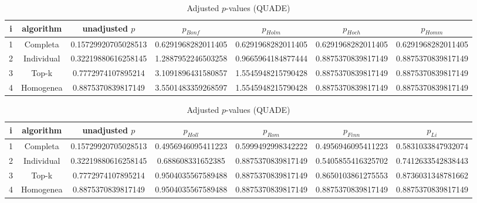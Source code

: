 \documentclass[a4paper,10pt]{article}
\begin{document}
\begin{landscape}
\newpage

\begin{table}[!htp]
\centering\scriptsize
\caption{Adjusted $p$-values (QUADE)}
\begin{tabular}{ccccccc}
i&algorithm&unadjusted $p$&$p_{Bonf}$&$p_{Holm}$&$p_{Hoch}$&$p_{Homm}$\\
\hline
1&Completa&0.15729920705028513&0.6291968282011405&0.6291968282011405&0.6291968282011405&0.6291968282011405\\
2&Individual&0.32219880616258145&1.2887952246503258&0.9665964184877444&0.8875370839817149&0.8875370839817149\\
3&Top-k&0.7772974107895214&3.1091896431580857&1.5545948215790428&0.8875370839817149&0.8875370839817149\\
4&Homogenea&0.8875370839817149&3.5501483359268597&1.5545948215790428&0.8875370839817149&0.8875370839817149\\
\hline
\end{tabular}
\end{table}

\begin{table}[!htp]
\centering\scriptsize
\caption{Adjusted $p$-values (QUADE)}
\begin{tabular}{ccccccc}
i&algorithm&unadjusted $p$&$p_{Holl}$&$p_{Rom}$&$p_{Finn}$&$p_{Li}$\\
\hline
1&Completa&0.15729920705028513&0.4956946095411223&0.5999492998342222&0.4956946095411223&0.5831033847932074\\
2&Individual&0.32219880616258145&0.688608331652385&0.8875370839817149&0.5405855416325702&0.7412633542838443\\
3&Top-k&0.7772974107895214&0.9504035567589488&0.8875370839817149&0.8650103861275553&0.8736031348781662\\
4&Homogenea&0.8875370839817149&0.9504035567589488&0.8875370839817149&0.8875370839817149&0.8875370839817149\\
\hline
\end{tabular}
\end{table}

\end{landscape}
\end{document}
